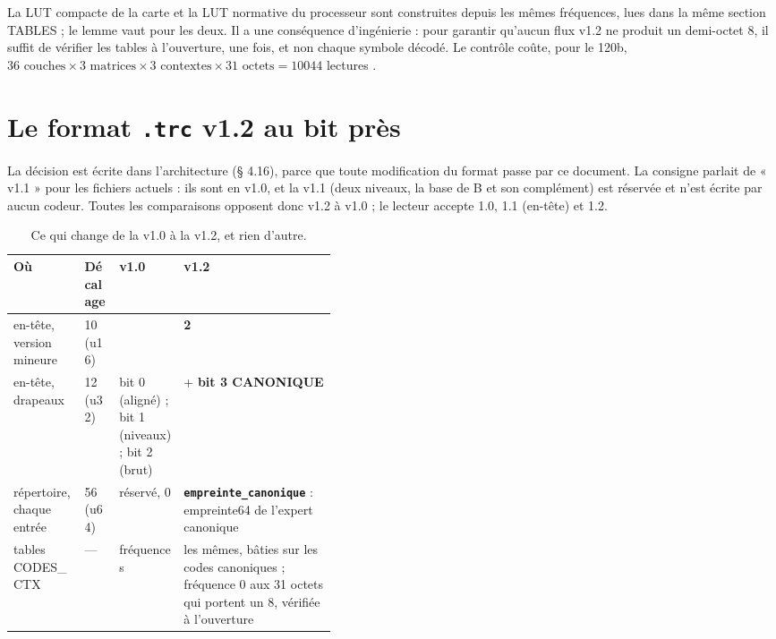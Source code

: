 La LUT compacte de la carte et la LUT normative du processeur sont construites depuis les mêmes fréquences, lues dans la même section TABLES ; le lemme vaut pour les deux. Il a une conséquence d'ingénierie : pour garantir qu'aucun flux v1.2 ne produit un demi-octet 8, il suffit de vérifier les tables à l'ouverture, une fois, et non chaque symbole décodé. Le contrôle coûte, pour le 120b, $36 \text{ couches} \times 3 \text{ matrices} \times 3 \text{ contextes} \times 31 \text{ octets} = \num{10044}$ lectures \calc.

\section{Le format \texttt{.trc} v1.2 au bit près}\label{t3cod:sec:format}

La décision est écrite dans l'architecture (§ 4.16), parce que toute modification du format passe par ce document. La consigne parlait de « v1.1 » pour les fichiers actuels : ils sont en v1.0, et la v1.1 (deux niveaux, la base de B et son complément) est réservée et n'est écrite par aucun codeur. Toutes les comparaisons opposent donc v1.2 à v1.0 ; le lecteur accepte 1.0, 1.1 (en-tête) et 1.2.

\begin{table}[ht]
\centering\small
\caption[Ce qui change de la v1.0 à la v1.2]{Ce qui change de la v1.0 à la v1.2, et rien d'autre.}
\label{t3cod:tab:format}
\begin{tabularx}{\linewidth}{@{}>{\raggedright\arraybackslash}p{0.22\linewidth}l>{\raggedright\arraybackslash}p{0.2\linewidth}>{\raggedright\arraybackslash}X@{}}
\toprule
Où & Décalage & v1.0 & v1.2 \\
\midrule
en-tête, version mineure & 10 (u16) & 0 & \textbf{2} \\
en-tête, drapeaux & 12 (u32) & bit 0 (aligné) ; bit 1 (niveaux) ; bit 2 (brut) & + \textbf{bit 3 CANONIQUE} \\
répertoire, chaque entrée & 56 (u64) & réservé, 0 & \textbf{\texttt{empreinte\_canonique}} : empreinte64 de l'expert canonique \\
tables CODES\_CTX & --- & 256 fréquences & les mêmes, bâties sur les codes canoniques ; fréquence 0 aux 31 octets qui portent un 8, vérifiée à l'ouverture \\
\bottomrule
\end{tabularx}
\end{table}

